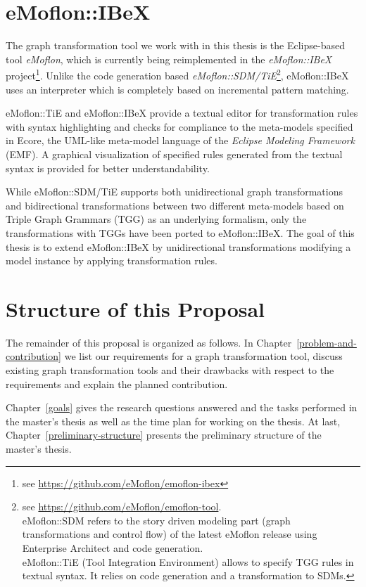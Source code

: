 \section{eMoflon::IBeX}
The graph transformation tool we work with in this thesis is the Eclipse-based tool \textit{eMoflon}, which is currently being reimplemented in the \textit{eMoflon::IBeX} project\footnote{see \url{https://github.com/eMoflon/emoflon-ibex}}.
Unlike the code generation based \textit{eMoflon::SDM/TiE}\footnote{see \url{https://github.com/eMoflon/emoflon-tool}. \\
	eMoflon::SDM refers to the story driven modeling part (graph transformations and control flow) of the latest eMoflon release using Enterprise Architect and code generation. \\
	eMoflon::TiE (Tool Integration Environment) allows to specify TGG rules in textual syntax. It relies on code generation and a transformation to SDMs.},
eMoflon::IBeX uses an interpreter which is completely based on incremental pattern matching.

eMoflon::TiE and eMoflon::IBeX provide a textual editor for transformation rules with syntax highlighting and checks for compliance to the meta-models specified in Ecore, the UML-like meta-model language of the \textit{Eclipse Modeling Framework} (EMF).
A graphical visualization of specified rules generated from the textual syntax is provided for better understandability.

While eMoflon::SDM/TiE supports both unidirectional graph transformations and bidirectional transformations between two different meta-models based on Triple Graph Grammars (TGG) as an underlying formalism, only the transformations with TGGs have been ported to eMoflon::IBeX.
The goal of this thesis is to extend eMoflon::IBeX by unidirectional transformations modifying a model instance by applying transformation rules.

\section{Structure of this Proposal}
\label{structure}
The remainder of this proposal is organized as follows.
In Chapter~\ref{problem-and-contribution} we list our requirements for a graph transformation tool,
discuss existing graph transformation tools and their drawbacks with respect to the requirements
and explain the planned contribution.
 
Chapter~\ref{goals} gives the research questions answered and the tasks performed in the master's thesis as well as the time plan for working on the thesis.
At last, Chapter~\ref{preliminary-structure} presents the preliminary structure of the master's thesis.
